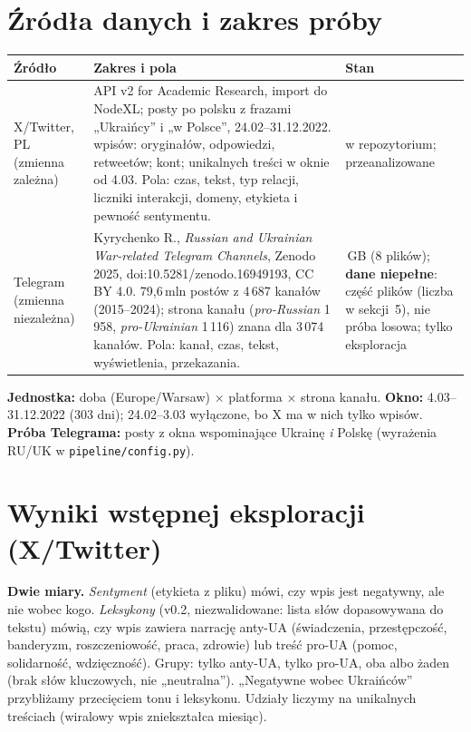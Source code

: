 \documentclass[10pt,a4paper]{article}
\begin{document}
\section{Źródła danych i zakres próby}
\begin{tabularx}{\linewidth}{@{}>{\raggedright\arraybackslash}p{2.3cm}X>{\raggedright\arraybackslash}p{3.3cm}@{}}
\toprule
Źródło & Zakres i pola & Stan \\
\midrule
X/Twitter, PL (zmienna zależna) & API v2 for Academic Research, import do NodeXL; posty po polsku z frazami „Ukraińcy” i „w Polsce”, 24.02--31.12.2022.
\EdaNRows{} wpisów: \EdaNOrig{} oryginałów, \EdaNReply{} odpowiedzi, \EdaNRt{} retweetów; \EdaNAuthors{} kont; \EdaNContents{} unikalnych treści w oknie od 4.03.
Pola: czas, tekst, typ relacji, liczniki interakcji, domeny, etykieta i pewność sentymentu. & w repozytorium; przeanalizowane \\
Telegram (zmienna niezależna) & Kyrychenko R., \emph{Russian and Ukrainian War-related Telegram Channels}, Zenodo 2025, doi:10.5281/zenodo.16949193, CC BY 4.0.
79,6\,mln postów z 4\,687 kanałów (2015--2024); strona kanału (\emph{pro-Russian} 1\,958, \emph{pro-Ukrainian} 1\,116) znana dla 3\,074 kanałów.
Pola: kanał, czas, tekst, wyświetlenia, przekazania. & 49\,GB (8 plików); \textbf{dane niepełne}: część plików (liczba w sekcji~5), nie próba losowa; tylko eksploracja \\
\bottomrule
\end{tabularx}

\textbf{Jednostka:} doba (Europe/Warsaw) × platforma × strona kanału. \textbf{Okno:} 4.03--31.12.2022 (303 dni); 24.02--3.03 wyłączone, bo X ma w nich tylko \EdaNBeforeEff{} wpisów.
\textbf{Próba Telegrama:} posty z okna wspominające Ukrainę \emph{i} Polskę (wyrażenia RU/UK w \texttt{pipeline/config.py}).

\section{Wyniki wstępnej eksploracji (X/Twitter)}
\textbf{Dwie miary.} \emph{Sentyment} (etykieta z pliku) mówi, czy wpis jest negatywny, ale nie wobec kogo. \emph{Leksykony} (v0.2, niezwalidowane: lista słów dopasowywana do tekstu)
mówią, czy wpis zawiera narrację anty-UA (świadczenia, przestępczość, banderyzm, roszczeniowość, praca, zdrowie) lub treść pro-UA (pomoc, solidarność, wdzięczność).
Grupy: tylko anty-UA, tylko pro-UA, oba albo żaden (brak słów kluczowych, nie „neutralna”). „Negatywne wobec Ukraińców” przybliżamy przecięciem tonu i leksykonu. Udziały liczymy na unikalnych treściach (wiralowy wpis zniekształca miesiąc).
\end{document}

